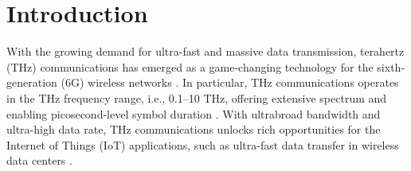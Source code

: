 \documentclass[10pt,technote]{IEEEtran}
\newcommand{\1}{\mathbbm{1}}
\begin{document}
\vspace{-3mm}

\section{Introduction}

With the growing demand for ultra-fast and massive data transmission, terahertz (THz) communications has emerged as a game-changing technology for the sixth-generation (6G) wireless networks \cite{6GNet2020}. In particular, THz communications operates in the THz frequency range, i.e., 0.1--10 THz, offering extensive spectrum and enabling picosecond-level symbol duration \cite{THzComMCS2024}. With ultrabroad bandwidth and ultra-high data rate, THz communications unlocks rich opportunities for the Internet of Things (IoT) applications, such as ultra-fast data transfer in wireless data centers \cite{Shafie2023}. 

\end{document}
